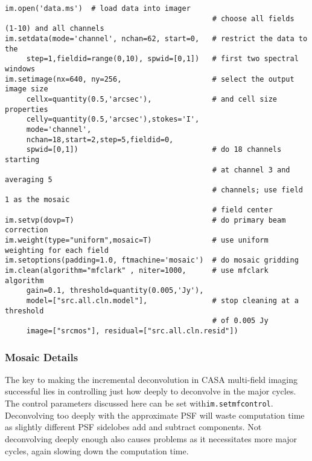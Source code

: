 \small
\begin{verbatim}
im.open('data.ms')  # load data into imager
                                                # choose all fields (1-10) and all channels
im.setdata(mode='channel', nchan=62, start=0,   # restrict the data to the
     step=1,fieldid=range(0,10), spwid=[0,1])   # first two spectral windows
im.setimage(nx=640, ny=256,                     # select the output image size
     cellx=quantity(0.5,'arcsec'),              # and cell size properties
     celly=quantity(0.5,'arcsec'),stokes='I',
     mode='channel',
     nchan=18,start=2,step=5,fieldid=0,
     spwid=[0,1])                               # do 18 channels starting
                                                # at channel 3 and averaging 5
                                                # channels; use field 1 as the mosaic
                                                # field center
im.setvp(dovp=T)                                # do primary beam correction
im.weight(type="uniform",mosaic=T)              # use uniform weighting for each field
im.setoptions(padding=1.0, ftmachine='mosaic')  # do mosaic gridding
im.clean(algorithm="mfclark" , niter=1000,      # use mfclark algorithm
     gain=0.1, threshold=quantity(0.005,'Jy'),
     model=["src.all.cln.model"],               # stop cleaning at a threshold
                                                # of 0.005 Jy
     image=["srcmos"], residual=["src.all.cln.resid"])
\end{verbatim}
\normalsize


\subsubsection{Mosaic Details}
\label{subsubsection:synth.mosaic.details}

\vspace{3mm}

The key to making the incremental deconvolution in CASA multi-field
imaging successful lies in controlling just how deeply to deconvolve
in the major cycles.  The control parameters discussed here can be set
with{\tt im.setmfcontrol}.  Deconvolving too deeply with the
approximate PSF will waste computation time as slightly different PSF
sidelobes add and subtract components.  Not deconvolving deeply enough
also causes problems as it necessitates more major cycles, again
slowing down the computation time.

